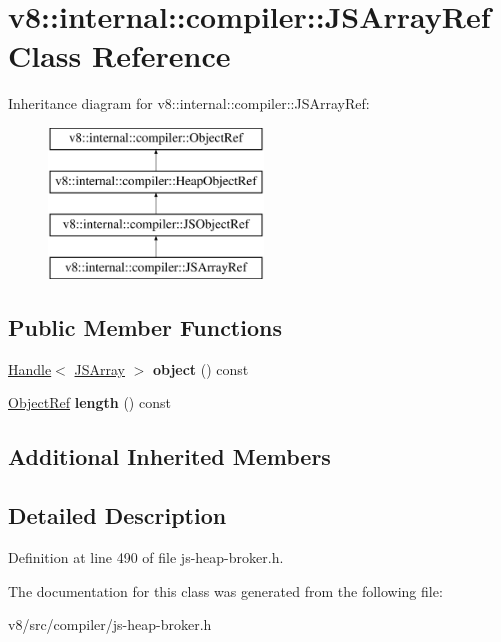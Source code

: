 \hypertarget{classv8_1_1internal_1_1compiler_1_1JSArrayRef}{}\section{v8\+:\+:internal\+:\+:compiler\+:\+:J\+S\+Array\+Ref Class Reference}
\label{classv8_1_1internal_1_1compiler_1_1JSArrayRef}
Inheritance diagram for v8\+:\+:internal\+:\+:compiler\+:\+:J\+S\+Array\+Ref\+:\begin{figure}[H]
\begin{center}
\leavevmode
\includegraphics[height=4.000000cm]{classv8_1_1internal_1_1compiler_1_1JSArrayRef}
\end{center}
\end{figure}
\subsection*{Public Member Functions}
\begin{DoxyCompactItemize}
\item 
\mbox{\label{classv8_1_1internal_1_1compiler_1_1JSArrayRef_aeaa39bc573377f5bdcf0f4d347ed475e}} 
\mbox{\hyperlink{classv8_1_1internal_1_1Handle}{Handle}}$<$ \mbox{\hyperlink{classv8_1_1internal_1_1JSArray}{J\+S\+Array}} $>$ {\bfseries object} () const
\item 
\mbox{\label{classv8_1_1internal_1_1compiler_1_1JSArrayRef_a7e67830d46ea4ec1574288884571bd6e}} 
\mbox{\hyperlink{classv8_1_1internal_1_1compiler_1_1ObjectRef}{Object\+Ref}} {\bfseries length} () const
\end{DoxyCompactItemize}
\subsection*{Additional Inherited Members}


\subsection{Detailed Description}


Definition at line 490 of file js-\/heap-\/broker.\+h.



The documentation for this class was generated from the following file\+:\begin{DoxyCompactItemize}
\item 
v8/src/compiler/js-\/heap-\/broker.\+h\end{DoxyCompactItemize}

